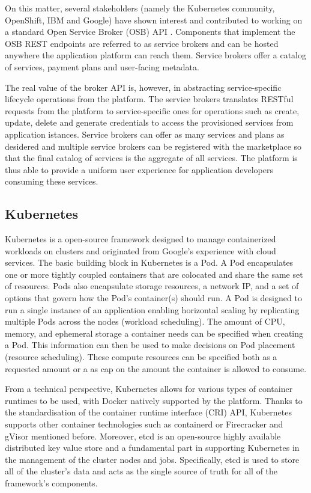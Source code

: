 \documentclass{ieeeaccess}
\begin{document}
On this matter, several stakeholders (namely the Kubernetes community, OpenShift, IBM and Google) have shown interest and contributed to working on a standard Open Service Broker (OSB) API \cite{osb}. Components that implement the OSB REST endpoints are referred to as service brokers and can be hosted anywhere the application platform can reach them. Service brokers offer a catalog of services, payment plans and user-facing metadata.

The real value of the broker API is, however, in abstracting service-specific lifecycle operations from the platform. The service brokers translates RESTful requests from the platform to service-specific ones for operations such as create, update, delete and generate credentials to access the provisioned services from application istances. Service brokers can offer as many services and plans as desidered and multiple service brokers can be registered with the marketplace so that the final catalog of services is the aggregate of all services. The platform is thus able to provide a uniform user experience for application developers consuming these services.

\subsection{Kubernetes}
\label{sec:kubernetes}

Kubernetes \cite{kubernetes} is a open-source framework designed to manage containerized workloads on clusters and originated from Google's experience with cloud services. The basic building block in Kubernetes is a Pod. A Pod encapsulates one or more tightly coupled containers that are colocated and share the same set of resources. Pods also encapsulate storage resources, a network IP, and a set of options that govern how the Pod's container(s) should run. A Pod is designed to run a single instance of an application enabling horizontal scaling by replicating multiple Pods across the nodes (workload scheduling). The amount of CPU, memory, and ephemeral storage a container needs can be specified when creating a Pod. This information can then be used to make decisions on Pod placement (resource scheduling). These compute resources can be specified both as a requested amount or a as cap on the amount the container is allowed to consume.

From a technical perspective, Kubernetes allows for various types of container runtimes to be used, with Docker natively supported by the platform. Thanks to the standardisation of the container runtime interface (CRI) API, Kubernetes supports other container technologies such as containerd \cite{containerd} or Firecracker and gVisor mentioned before. Moreover, etcd is an open-source highly available distributed key value store and a fundamental part in supporting Kubernetes in the management of the cluster nodes and jobs. Specifically, etcd is used to store all of the cluster's data and acts as the single source of truth for all of the framework's components.
\end{document}
